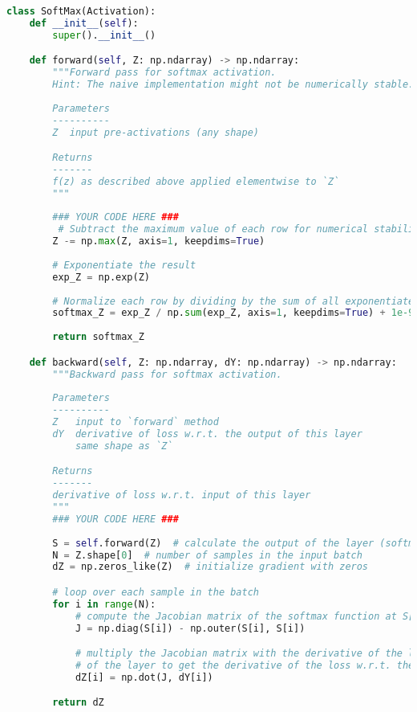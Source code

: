 \begin{lstlisting}[language=Python]
class SoftMax(Activation):
    def __init__(self):
        super().__init__()

    def forward(self, Z: np.ndarray) -> np.ndarray:
        """Forward pass for softmax activation.
        Hint: The naive implementation might not be numerically stable.
        
        Parameters
        ----------
        Z  input pre-activations (any shape)

        Returns
        -------
        f(z) as described above applied elementwise to `Z`
        """
        
        ### YOUR CODE HERE ###
         # Subtract the maximum value of each row for numerical stability
        Z -= np.max(Z, axis=1, keepdims=True)
    
        # Exponentiate the result
        exp_Z = np.exp(Z)
    
        # Normalize each row by dividing by the sum of all exponentiated values
        softmax_Z = exp_Z / np.sum(exp_Z, axis=1, keepdims=True) + 1e-9       
        
        return softmax_Z

    def backward(self, Z: np.ndarray, dY: np.ndarray) -> np.ndarray:
        """Backward pass for softmax activation.
        
        Parameters
        ----------
        Z   input to `forward` method
        dY  derivative of loss w.r.t. the output of this layer
            same shape as `Z`

        Returns
        -------
        derivative of loss w.r.t. input of this layer
        """
        ### YOUR CODE HERE ###
        
        S = self.forward(Z)  # calculate the output of the layer (softmax function applied to Z)
        N = Z.shape[0]  # number of samples in the input batch
        dZ = np.zeros_like(Z)  # initialize gradient with zeros

        # loop over each sample in the batch
        for i in range(N):
            # compute the Jacobian matrix of the softmax function at S[i]
            J = np.diag(S[i]) - np.outer(S[i], S[i])

            # multiply the Jacobian matrix with the derivative of the loss w.r.t. the output
            # of the layer to get the derivative of the loss w.r.t. the input to the layer
            dZ[i] = np.dot(J, dY[i])

        return dZ

\end{lstlisting}


